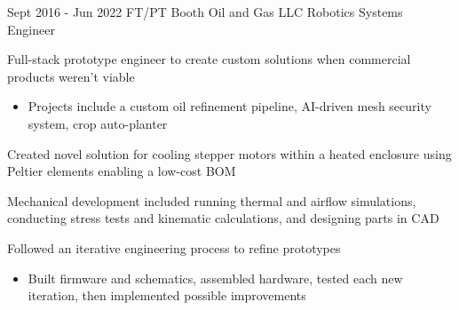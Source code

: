 \documentclass[
	12pt, %
]{FreemanCV}
\begin{document}
	
\jobentry
{Sept 2016 - Jun 2022} %
{FT/PT} %
{Booth Oil and Gas LLC} %
{Robotics Systems Engineer} %
{ %
	\item Full-stack prototype engineer to create custom solutions when commercial products weren't viable
	\begin{itemize}[topsep=-10pt, leftmargin=10pt, label=\(\circ\)]
		\item Projects include a custom oil refinement pipeline, AI-driven mesh security system, crop auto-planter
	\end{itemize}
	\item Created novel solution for cooling stepper motors within a heated enclosure using Peltier elements enabling a low-cost BOM
	\item Mechanical development included running thermal and airflow simulations, conducting stress tests and kinematic calculations, and designing parts in CAD
	\item Followed an iterative engineering process to refine prototypes
	\begin{itemize}[topsep=-10pt, leftmargin=10pt, label=\(\circ\)]
		\item Built firmware and schematics, assembled hardware, tested each new iteration, then implemented possible improvements
	\end{itemize}
}


\vspace*{-10pt}
\end{document}
